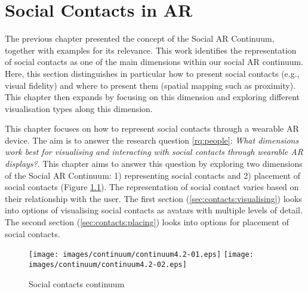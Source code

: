 \chapter{Social Contacts in AR}
\label{ch:contacts} 

The previous chapter presented the concept of the Social AR Continuum, together with examples for its relevance. This work identifies the representation of social contacts as one of the main dimensions within our social AR continuum. Here, this section distinguishes in particular how to present social contacts (e.g., visual fidelity) and where to present them (spatial mapping such as proximity). This chapter then expands by focusing on this dimension and exploring different visualisation types along this dimension. 

This chapter focuses on how to represent social contacts through a wearable AR device. The aim is to answer the research question \ref{rq:people}: \textit{What dimensions work best for visualising and interacting with social contacts through wearable AR displays?}. This chapter aims to answer this question by exploring two dimensions of the Social AR Continuum: 1) representing social contacts and 2) placement of social contacts (Figure \ref{fig:contacts:contacts-continuum}). The representation of social contact varies based on their relationship with the user. 
The first section (\ref{sec:contacts:visualising}) looks into options of visualising social contacts as avatars with multiple levels of detail. The second section (\ref{sec:contacts:placing}) looks into options for placement of social contacts. 

\begin{figure}[h]
  \centering
  \texttt{[image: images/continuum/continuum4.2-01.eps]}
  \texttt{[image: images/continuum/continuum4.2-02.eps]}
  \caption{Social contacts continuum}
  \label{fig:contacts:contacts-continuum}
\end{figure}





